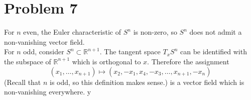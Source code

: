 \documentclass{amsart}
\numberwithin{equation}{section}
\theoremstyle{plain}
\theoremstyle{definition}
\theoremstyle{remark}
\renewcommand{\_}[2]{\underbrace{#1}_{#2}}
\renewcommand{\^}[2]{\overbrace{#1}_{#2}}
\newcommand{\R}{\mathbb{R}}
\begin{document}
\section*{Problem 7}
For $n$ even, the Euler characteristic of $S^n$ is non-zero, so $S^n$ does not admit a non-vanishing vector field.\\

For $n$ odd, consider $S^n \subset \R^{n+1}$. The tangent space $T_xS^n$ can be identified with the subspace of $\R^{n+1}$ which is orthogonal to $x$. Therefore the assignment \[(x_1, \dots, x_{n+1}) \mapsto (x_2, -x_1, x_4, -x_3, \dots, x_{n+1}, -x_n)\] (Recall that $n$ is odd, so this definition makes sense.) is a vector field which is non-vanishing everywhere. 
y
\end{document}
